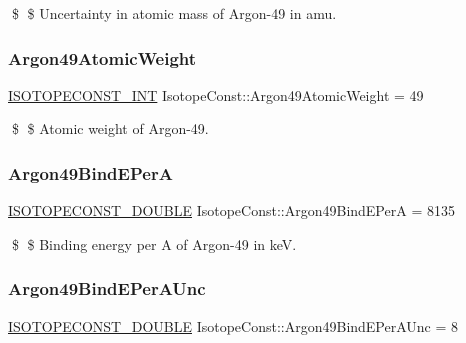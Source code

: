 \$ \$ Uncertainty in atomic mass of Argon-\/49 in amu. \mbox{\label{group___isotope_const-_argon-_ar49_ga98eb56511403f5c82d30560060f421e0}} 
\subsubsection{\texorpdfstring{Argon49\+Atomic\+Weight}{Argon49AtomicWeight}}
{\footnotesize\ttfamily \mbox{\hyperlink{group___isotope_const-_macros_ga5f18360b3e99483a35c32d789e62621c}{I\+S\+O\+T\+O\+P\+E\+C\+O\+N\+S\+T\+\_\+\+I\+NT}} Isotope\+Const\+::\+Argon49\+Atomic\+Weight = 49}

\$ \$ Atomic weight of Argon-\/49. \mbox{\label{group___isotope_const-_argon-_ar49_ga23806384048f37c4371b7e6c21759185}} 
\subsubsection{\texorpdfstring{Argon49\+Bind\+E\+PerA}{Argon49BindEPerA}}
{\footnotesize\ttfamily \mbox{\hyperlink{group___isotope_const-_macros_ga8f45a7272ce02c0b4c65c44636ed719a}{I\+S\+O\+T\+O\+P\+E\+C\+O\+N\+S\+T\+\_\+\+D\+O\+U\+B\+LE}} Isotope\+Const\+::\+Argon49\+Bind\+E\+PerA = 8135}

\$ \$ Binding energy per A of Argon-\/49 in keV. \mbox{\label{group___isotope_const-_argon-_ar49_gac17d92df92327dd4311075556b31ef75}} 
\subsubsection{\texorpdfstring{Argon49\+Bind\+E\+Per\+A\+Unc}{Argon49BindEPerAUnc}}
{\footnotesize\ttfamily \mbox{\hyperlink{group___isotope_const-_macros_ga8f45a7272ce02c0b4c65c44636ed719a}{I\+S\+O\+T\+O\+P\+E\+C\+O\+N\+S\+T\+\_\+\+D\+O\+U\+B\+LE}} Isotope\+Const\+::\+Argon49\+Bind\+E\+Per\+A\+Unc = 8}

